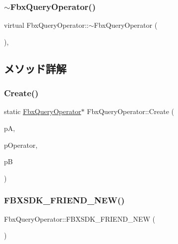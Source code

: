 \subsubsection{\texorpdfstring{$\sim$\+Fbx\+Query\+Operator()}{~FbxQueryOperator()}}
{\footnotesize\ttfamily virtual Fbx\+Query\+Operator\+::$\sim$\+Fbx\+Query\+Operator (\begin{DoxyParamCaption}{ }\end{DoxyParamCaption})\hspace{0.3cm}{\ttfamily [protected]}, {\ttfamily [virtual]}}



\subsection{メソッド詳解}
\mbox{\label{class_fbx_query_operator_aa509a5fb63d706c86ec3bc530e21f272}} 
\subsubsection{\texorpdfstring{Create()}{Create()}}
{\footnotesize\ttfamily static \hyperlink{class_fbx_query_operator}{Fbx\+Query\+Operator}$\ast$ Fbx\+Query\+Operator\+::\+Create (\begin{DoxyParamCaption}\item[{\hyperlink{class_fbx_query}{Fbx\+Query} $\ast$}]{pA,  }\item[{\hyperlink{class_fbx_query_operator_aadf25d36a6eab339504a02ce57fd6ad4}{E\+Type}}]{p\+Operator,  }\item[{\hyperlink{class_fbx_query}{Fbx\+Query} $\ast$}]{pB }\end{DoxyParamCaption})\hspace{0.3cm}{\ttfamily [static]}}

\mbox{\label{class_fbx_query_operator_a3cd85ca0a8ff67d6670b36d06dcaf950}} 
\subsubsection{\texorpdfstring{F\+B\+X\+S\+D\+K\+\_\+\+F\+R\+I\+E\+N\+D\+\_\+\+N\+E\+W()}{FBXSDK\_FRIEND\_NEW()}}
{\footnotesize\ttfamily Fbx\+Query\+Operator\+::\+F\+B\+X\+S\+D\+K\+\_\+\+F\+R\+I\+E\+N\+D\+\_\+\+N\+EW (\begin{DoxyParamCaption}{ }\end{DoxyParamCaption})}

